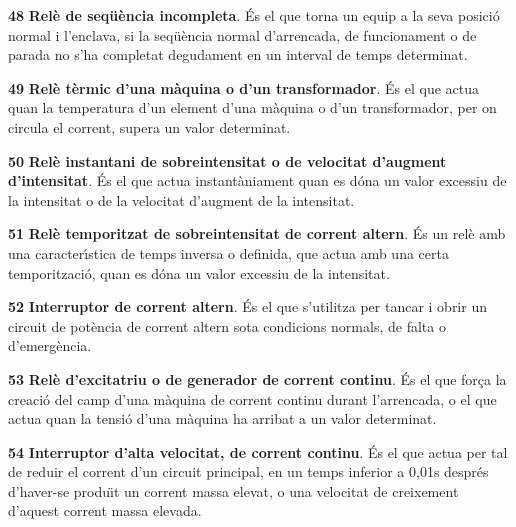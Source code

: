 \begin{multicols}{2}
\begin{list}{}
\item[\textbf{48}]  \textbf{Rel\`{e} de seq\"{u}\`{e}ncia
incompleta}. \'{E}s el que torna un equip a la seva posici\'{o} normal  i
l'enclava, si la seq\"{u}\`{e}ncia normal d'arrencada, de funcionament o de
parada no s'ha completat degudament en un interval de temps
determinat.

\item[\textbf{49}] 
\textbf{Rel\`{e} t\`{e}rmic d'una m\`{a}quina o d'un transformador}. \'{E}s el que
actua quan la temperatura d'un element d'una m\`{a}quina o d'un
transformador, per on circula el corrent, supera un valor
determinat.

\item[\textbf{50}]  \textbf{Rel\`{e} instantani de sobreintensitat o de velocitat d'augment
d'intensitat}. \'{E}s el que actua instant\`{a}niament quan es d\'{o}na un valor excessiu de la
intensitat o de la  velocitat d'augment de la intensitat.

\item[\textbf{51}] 
\textbf{Rel\`{e} temporitzat de sobreintensitat de corrent altern}. \'{E}s
un rel\`{e} amb una caracter\'{\i}stica de temps inversa o definida, que
actua amb una certa temporitzaci\'{o}, quan es d\'{o}na un valor excessiu de
la intensitat.

\item[\textbf{52}]  \textbf{Interruptor de corrent altern}. \'{E}s
 el que s'utilitza per tancar i obrir un circuit de pot\`{e}ncia de corrent altern sota condicions
normals, de falta o d'emerg\`{e}ncia.

\item[\textbf{53}] 
\textbf{Rel\`{e} d'excitatriu o de generador de corrent continu}. \'{E}s el
que for\c{c}a la creaci\'{o} del camp d'una m\`{a}quina de corrent continu
durant l'arrencada, o el que actua quan la tensi\'{o} d'una m\`{a}quina ha
arribat a un valor determinat.

\item[\textbf{54}] 
\textbf{Interruptor d'alta velocitat, de corrent continu}. \'{E}s el que
actua per tal de reduir el corrent d'un circuit principal, en un
temps inferior a 0,01\unit{s} despr\'{e}s d'haver-se produ\"{\i}t un corrent
massa elevat, o una velocitat de creixement d'aquest corrent massa
elevada.


\end{list}
\end{multicols}
